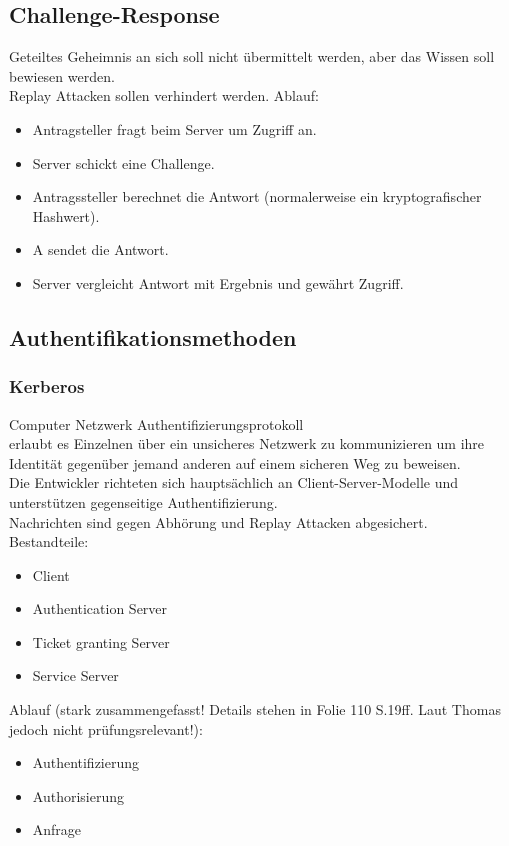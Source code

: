 \documentclass{article} %
\begin{document}
\subsection{Challenge-Response}
Geteiltes Geheimnis an sich soll nicht übermittelt werden, aber das Wissen soll bewiesen werden.\\
Replay Attacken sollen verhindert werden.
Ablauf:
\begin{itemize}
	\item Antragsteller fragt beim Server um Zugriff an.
    \item Server schickt eine Challenge.
    \item Antragssteller berechnet die Antwort (normalerweise ein kryptografischer Hashwert).
    \item A sendet die Antwort.
    \item Server vergleicht Antwort mit Ergebnis und gewährt Zugriff.
\end{itemize}
\subsection{Authentifikationsmethoden}
\subsubsection{Kerberos}
Computer Netzwerk Authentifizierungsprotokoll\\
erlaubt es Einzelnen über ein unsicheres Netzwerk zu kommunizieren um ihre Identität gegenüber jemand anderen auf einem sicheren Weg zu beweisen.\\
Die Entwickler richteten sich hauptsächlich an Client-Server-Modelle und  unterstützen gegenseitige Authentifizierung.\\
Nachrichten sind gegen Abhörung und Replay Attacken abgesichert.\\
Bestandteile:
\begin{itemize}
	\item Client
    \item Authentication Server
    \item Ticket granting Server
    \item Service Server
\end{itemize}
Ablauf (stark zusammengefasst! Details stehen in Folie 110 S.19ff. Laut Thomas jedoch nicht prüfungsrelevant!):
\begin{itemize}
	\item Authentifizierung
    \item Authorisierung
    \item Anfrage
\end{itemize}
\end{document}
